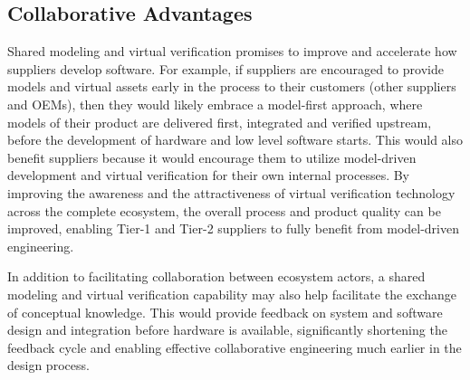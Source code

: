 \subsection{Collaborative Advantages}


Shared modeling and virtual verification promises to improve and accelerate how suppliers develop software.
For example, if suppliers are encouraged to provide models and virtual assets early in the process to their customers (other suppliers and OEMs),
then they would likely embrace a model-first approach,
where models of their product are delivered first, integrated and verified upstream, before the development of hardware and low level software starts.
This would also benefit suppliers because it would encourage them to utilize model-driven development and virtual verification for their own internal processes.
By improving the awareness and the attractiveness of virtual verification technology across the complete ecosystem, the overall process and product quality can be improved, enabling Tier-1 and Tier-2 suppliers to fully benefit from model-driven engineering.

In addition to facilitating collaboration between ecosystem actors, a shared modeling and virtual verification capability may also help facilitate the exchange of conceptual knowledge. This would provide feedback on system and software design and integration before hardware is available, significantly shortening the feedback cycle and enabling effective collaborative engineering much earlier in the design process.

